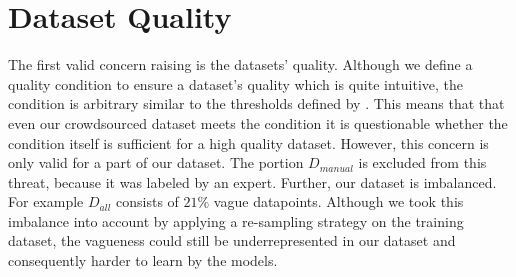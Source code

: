 \section{Dataset Quality}
\label{chp:threats_to_validity:sec:dataset_quality}

The first valid concern raising is the datasets' quality.
Although we define a quality condition to ensure a dataset's quality which is quite intuitive, the condition is arbitrary similar to the thresholds defined by \textcite{Landis:1977}.
This means that that even our crowdsourced dataset meets the condition it is questionable whether the condition itself is sufficient for a high quality dataset.
However, this concern is only valid for a part of our dataset.
The portion $D_{manual}$ is excluded from this threat, because it was labeled by an expert.
Further, our dataset is imbalanced.
For example $D_{all}$ consists of $21\%$ vague datapoints.
Although we took this imbalance into account by applying a re-sampling strategy on the training dataset, the vagueness could still be underrepresented in our dataset and consequently harder to learn by the models.

